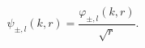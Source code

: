 \begin{equation}
\label{Eq_0302}
\psi_{\pm,l}(k,r) = \frac{\varphi_{\pm,l}(k,r)}{\sqrt{r}}.
\end{equation}

